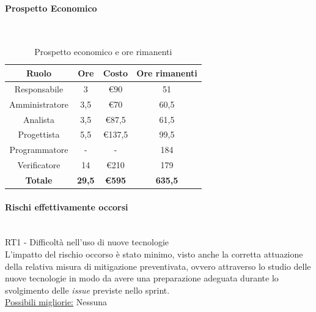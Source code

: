 \documentclass{article}
\begin{document}
                \paragraph{Prospetto Economico}\mbox{}\\
                \begin{table}[H]
                    \centering
                    \begin{tabular}{|c|c|c|c|}
                    \hline
                    \textbf{Ruolo}  & \textbf{Ore}  & \textbf{Costo} & \textbf{Ore rimanenti} \\ \hline
                    Responsabile    & 3             & €90            & 51                     \\ \hline
                    Amministratore  & 3,5           & €70            & 60,5                   \\ \hline
                    Analista        & 3,5           & €87,5          & 61,5                   \\ \hline
                    Progettista     & 5,5           & €137,5         & 99,5                   \\ \hline
                    Programmatore   & -            & -           & 184                    \\ \hline
                    Verificatore    & 14            & €210           & 179                    \\ \hline
                    \textbf{Totale} & \textbf{29,5} & \textbf{\euro595}   & \textbf{635,5}         \\ \hline
                    \end{tabular}
                    \caption{Prospetto economico e ore rimanenti}
                \end{table}

                \paragraph{Rischi effettivamente occorsi}\mbox{}\\
                RT1 - Difficoltà nell’uso di nuove tecnologie \\
                L’impatto del rischio occorso è stato minimo, visto anche la corretta attuazione della relativa misura di mitigazione preventivata, ovvero attraverso lo studio delle nuove tecnologie in modo da avere una preparazione adeguata durante lo svolgimento delle \textit{issue} previste nello sprint. \\
                \underline{Possibili migliorie:} Nessuna
\end{document}
